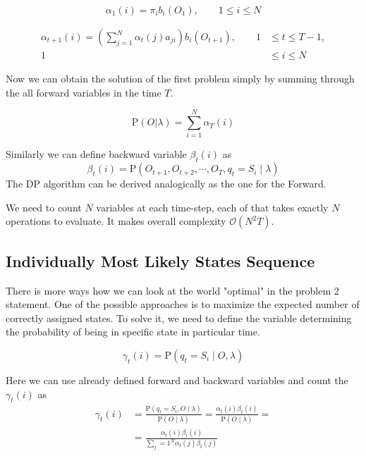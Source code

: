 \documentclass[thesis=M,english]{FITthesis}[2012/10/20]
\begin{document}
\begin{equation}
\alpha_1(i) = \pi_i b_i(O_1), \qquad 1 \leq i \leq N
\end{equation}

\begin{equation}
\begin{aligned}
\alpha_{t+1}(i) = \left( \sum_{j=1}^N \alpha_t(j) a_{ji} \right) b_i(O_{t+1}), \qquad 1& \leq t \leq T - 1, \\ 
                                                                                 1& \leq i \leq N		\end{aligned}
\end{equation}

Now we can obtain the solution of the first problem simply by summing through the all forward variables in the time $T$.

\begin{equation}
\mathrm{P}(O|\lambda) = \sum_{i=1}^N \alpha_T(i)
\end{equation} 

Similarly we can define backward variable $\beta_t(i)$ as
\begin{equation}
\beta_t(i) = \mathrm{P}(O_{t+1},O_{t+2},\cdots,O_T,q_t = S_i \mid \lambda ) 
\end{equation}
The DP algorithm can be derived analogically as the one for the Forward.

We need to count $N$ variables at each time-step, each of that takes exactly $N$ operations to evaluate. It makes overall complexity $\mathcal{O}(N^2T)$.    

\subsection{Individually Most Likely States Sequence}
There is more ways how we can look at the world "optimal" in the problem 2 statement. One of the possible approaches is to maximize the expected number of correctly assigned states. To solve it, we need to define the variable determining the probability of being in specific state in particular time.

\begin{equation}
\gamma_t(i) = \mathrm{P}(q_t = S_i \mid O,\lambda ) 
\end{equation}

Here we can use already defined forward and backward variables and count the $\gamma_t(i)$ as
\begin{equation}
\begin{aligned}
\gamma_t(i) &= \frac{ \mathrm{P}( q_t = S_i, O \mid \lambda )}{ \mathrm{P}( O \mid \lambda )} =
               \frac{  \alpha_t(i) \beta_t(i) }{ \mathrm{P}( O \mid \lambda )} = \\
            &= \frac{  \alpha_t(i) \beta_t(i) }{ \sum_j=1^N \alpha_t(j) \beta_t(j) } 
\end{aligned}
\end{equation}
\end{document}
